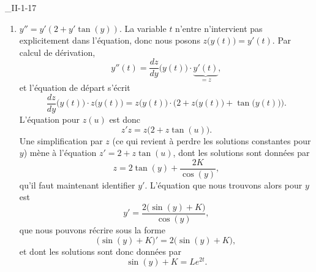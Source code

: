 \begin{corrige}{_II-1-17}
\begin{enumerate}
		\item
		      $y''=y'(2+y'\tan(y))$. La variable $t$ n'entre n'intervient pas explicitement dans l'équation, donc nous posons $z\big( y(t) \big)=y'(t)$. Par calcul de dérivation,
		      \begin{equation}
			      y''(t)=\frac{ dz }{ dy }\big( y(t) \big)\cdot \underbrace{y'(t)}_{=z},
		      \end{equation}
		      et l'équation de départ s'écrit
		      \begin{equation}
			      \frac{ dz }{ dy }\big( y(t) \big)\cdot z\big( y(t) \big)=z\big( y(t) \big)\cdot\Big( 2+z\big( y(t) \big)+\tan\big( y(t) \big) \Big).
		      \end{equation}
		      L'équation pour $z(u)$ est donc
		      \begin{equation}
			      z'z=z\big( 2+z\tan(u) \big).
		      \end{equation}
		      Une simplification par $z$ (ce qui revient à perdre les solutions constantes pour $y$) mène à l'équation $z'=2+z\tan(u)$, dont les solutions sont données par
		      \begin{equation}
			      z=2\tan(y)+\frac{ 2K }{ \cos(y) },
		      \end{equation}
		      qu'il faut maintenant identifier $y'$. L'équation que nous trouvons alors pour $y$ est
		      \begin{equation}
			      y'=\frac{ 2\big( \sin(y)+K \big) }{ \cos(y) },
		      \end{equation}
		      que nous pouvons récrire sous la forme
		      \begin{equation}
			      \big( \sin(y)+K \big)'=2\big( \sin(y)+K \big),
		      \end{equation}
		      et dont les solutions sont donc données par
		      \begin{equation}
			      \sin(y)+K=L e^{2t}.
		      \end{equation}


\end{enumerate}
\end{corrige}
